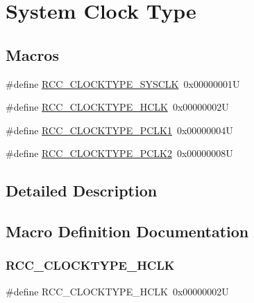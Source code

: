 \hypertarget{group___r_c_c___system___clock___type}{}\section{System Clock Type}
\label{group___r_c_c___system___clock___type}
\subsection*{Macros}
\begin{DoxyCompactItemize}
\item 
\#define \hyperlink{group___r_c_c___system___clock___type_ga7e721f5bf3fe925f78dae0356165332e}{R\+C\+C\+\_\+\+C\+L\+O\+C\+K\+T\+Y\+P\+E\+\_\+\+S\+Y\+S\+C\+LK}~0x00000001U
\item 
\#define \hyperlink{group___r_c_c___system___clock___type_gaa5330efbd790632856a2b15851517ef9}{R\+C\+C\+\_\+\+C\+L\+O\+C\+K\+T\+Y\+P\+E\+\_\+\+H\+C\+LK}~0x00000002U
\item 
\#define \hyperlink{group___r_c_c___system___clock___type_gab00c7b70f0770a616be4b5df45a454c4}{R\+C\+C\+\_\+\+C\+L\+O\+C\+K\+T\+Y\+P\+E\+\_\+\+P\+C\+L\+K1}~0x00000004U
\item 
\#define \hyperlink{group___r_c_c___system___clock___type_gaef7e78706e597a6551d71f5f9ad60cc0}{R\+C\+C\+\_\+\+C\+L\+O\+C\+K\+T\+Y\+P\+E\+\_\+\+P\+C\+L\+K2}~0x00000008U
\end{DoxyCompactItemize}


\subsection{Detailed Description}


\subsection{Macro Definition Documentation}
\mbox{\label{group___r_c_c___system___clock___type_gaa5330efbd790632856a2b15851517ef9}} 
\subsubsection{\texorpdfstring{R\+C\+C\+\_\+\+C\+L\+O\+C\+K\+T\+Y\+P\+E\+\_\+\+H\+C\+LK}{RCC\_CLOCKTYPE\_HCLK}}
{\footnotesize\ttfamily \#define R\+C\+C\+\_\+\+C\+L\+O\+C\+K\+T\+Y\+P\+E\+\_\+\+H\+C\+LK~0x00000002U}

